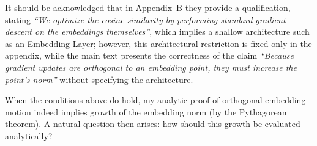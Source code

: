  It should be acknowledged that in Appendix~B they provide a qualification, stating \emph{``We optimize the cosine similarity by performing standard gradient descent on the embeddings themselves''}, which implies a shallow architecture such as an Embedding Layer; however, this architectural restriction is fixed only in the appendix, while the main text presents the correctness of the claim \emph{``Because gradient updates are orthogonal to an embedding point, they must increase the point’s norm''} without specifying the architecture.

When the conditions above do hold, my analytic proof of orthogonal embedding motion indeed implies growth of the embedding norm (by the Pythagorean theorem). A natural question then arises: how should this growth be evaluated analytically?


